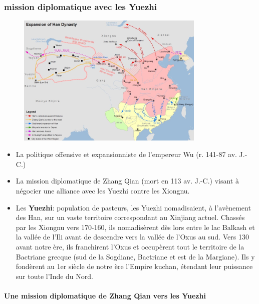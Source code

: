 \subsubsection{mission diplomatique avec les Yuezhi}
\begin{figure}[!h]
    \centering
    \includegraphics[width=0.8\textwidth]{ConfucianismeTaoismeBouddhismeChinois/Images/HanExpansion.jpg}

    \label{fig:enter-label}
\end{figure}

 

\begin{itemize}
   
   \item 	La politique offensive et expansionniste de l’empereur Wu (r. 141-87 av. J.-C.)
   \item 	La mission diplomatique de Zhang Qian (mort en 113 av. J.-C.) visant à négocier une alliance avec les Yuezhi contre les Xiongnu.
   \item Les \textbf{Yuezhi}: population de pasteurs, les Yuezhi nomadisaient, à l’avènement des Han, sur un vaste territoire correspondant au Xinjiang actuel. Chassés par les Xiongnu vers 170-160, ils nomadisèrent dès lors entre le lac Balkash et la vallée de l’Ili avant de descendre vers la vallée de l’Oxus au sud. Vers 130 avant notre ère, ils franchirent l’Oxus et occupèrent tout le territoire de la Bactriane grecque (sud de la Sogdiane, Bactriane et est de la Margiane). Ils y fondèrent au 1er siècle de notre ère l’Empire kuchan, étendant leur puissance sur toute l’Inde du Nord.
\end{itemize}

\paragraph{Une mission diplomatique de Zhang Qian vers les Yuezhi}

